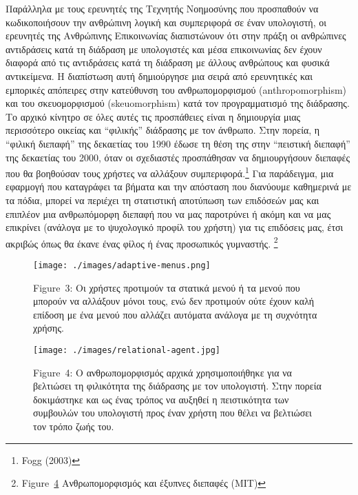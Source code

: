 \documentclass[
]{article}
\begin{document}
Παράλληλα με τους ερευνητές της Τεχνητής Νοημοσύνης που προσπαθούν να
κωδικοποιήσουν την ανθρώπινη λογική και συμπεριφορά σε έναν υπολογιστή,
οι ερευνητές της Ανθρώπινης Επικοινωνίας διαπιστώνουν ότι στην πράξη οι
ανθρώπινες αντιδράσεις κατά τη διάδραση με υπολογιστές και μέσα
επικοινωνίας δεν έχουν διαφορά από τις αντιδράσεις κατά τη διάδραση με
άλλους ανθρώπους και φυσικά αντικείμενα. Η διαπίστωση αυτή δημιούργησε
μια σειρά από ερευνητικές και εμπορικές απόπειρες στην κατεύθυνση του
ανθρωπομορφισμού (anthropomorphism) και του σκευομορφισμού
(skeuomorphism) κατά τον προγραμματισμό της διάδρασης. Το αρχικό κίνητρο
σε όλες αυτές τις προσπάθειες είναι η δημιουργία μιας περισσότερο
οικείας και ``φιλικής'' διάδρασης με τον άνθρωπο. Στην πορεία, η
``φιλική διεπαφή'' της δεκαετίας του 1990 έδωσε τη θέση της στην
``πειστική διεπαφή'' της δεκαετίας του 2000, όταν οι σχεδιαστές
προσπάθησαν να δημιουργήσουν διεπαφές που θα βοηθούσαν τους χρήστες να
αλλάξουν συμπεριφορά.\footnote{Fogg (2003)} Για παράδειγμα, μια εφαρμογή
που καταγράφει τα βήματα και την απόσταση που διανύουμε καθημερινά με τα
πόδια, μπορεί να περιέχει τη στατιστική αποτύπωση των επιδόσεών μας και
επιπλέον μια ανθρωπόμορφη διεπαφή που να μας παροτρύνει ή ακόμη και να
μας επικρίνει (ανάλογα με το ψυχολογικό προφίλ του χρήστη) για τις
επιδόσεις μας, έτσι ακριβώς όπως θα έκανε ένας φίλος ή ένας προσωπικός
γυμναστής. \footnote{Figure~\protect\hyperlink{fig:relational-agent}{4}
  Ανθρωπομορφισμός και έξυπνες διεπαφές (MIT)}

\leavevmode{}%
\begin{figure}
\hypertarget{fig:adaptive-menus}{%
\centering
\texttt{[image: ./images/adaptive-menus.png]}
\caption{Figure~3: Οι χρήστες προτιμούν τα στατικά μενού ή τα μενού που
μπορούν να αλλάξουν μόνοι τους, ενώ δεν προτιμούν ούτε έχουν καλή
επίδοση με ένα μενού που αλλάζει αυτόματα ανάλογα με τη συχνότητα
χρήσης.}\label{fig:adaptive-menus}
}
\end{figure}

\leavevmode{}%
\begin{figure}
\hypertarget{fig:relational-agent}{%
\centering
\texttt{[image: ./images/relational-agent.jpg]}
\caption{Figure~4: Ο ανθρωπομορφισμός αρχικά χρησιμοποιήθηκε για να
βελτιώσει τη φιλικότητα της διάδρασης με τον υπολογιστή. Στην πορεία
δοκιμάστηκε και ως ένας τρόπος να αυξηθεί η πειστικότητα των συμβουλών
του υπολογιστή προς έναν χρήστη που θέλει να βελτιώσει τον τρόπο ζωής
του.}\label{fig:relational-agent}
}
\end{figure}
\end{document}

